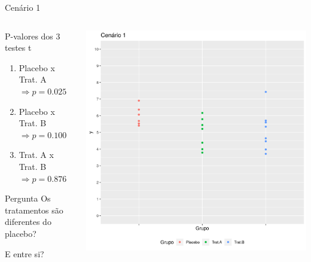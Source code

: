 \documentclass{beamer}
\begin{document}
\begin{frame}[label=cenario1-prob]{\small Cenário 1}
  \begin{columns}
    \begin{column}{5cm}
      \begin{exampleblock}{\footnotesize P-valores dos 3 testes t}
        \begin{enumerate}
          \tiny
        \item Placebo x Trat. A $\Rightarrow p=0.025$
        \item Placebo x Trat. B $\Rightarrow p=0.100$
        \item Trat. A x Trat. B $\Rightarrow p=0.876$
        \end{enumerate}
      \end{exampleblock}
      \bigskip
      \bigskip
      \begin{exampleblock}{\footnotesize Pergunta}
        \small
        Os tratamentos são diferentes do placebo?

        \bigskip
        E entre si?
      \end{exampleblock}
    \end{column}
    \begin{column}{5cm}
      \includegraphics[width=\textwidth]{Cap13-30/cenario1}
    \end{column}
  \end{columns}
\end{frame}
\end{document}
